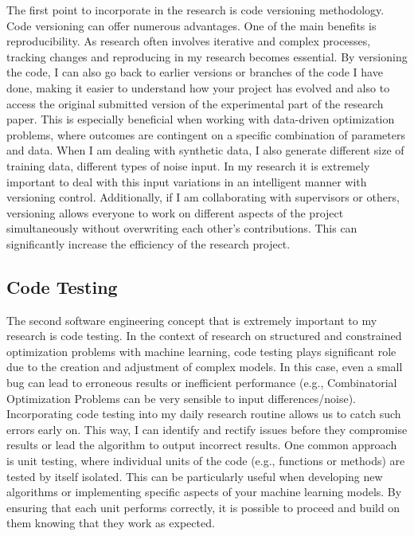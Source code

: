 \documentclass{article}
\begin{document}
The first point to incorporate in the research is code versioning methodology. Code versioning can offer numerous advantages. One of the main benefits is reproducibility. As research often involves iterative and complex processes, tracking changes and reproducing in my research becomes essential. By versioning the code, I can also go back to earlier versions or branches of the code I have done, making it easier to understand how your project has evolved and also to access the original submitted version of the experimental part of the research paper. This is especially beneficial when working with data-driven optimization problems, where outcomes are contingent on a specific combination of parameters and data. When I am dealing with synthetic data, I also generate different size of training data, different types of noise input. In my research it is extremely important to deal with this input variations in an intelligent manner with versioning control. Additionally, if I am collaborating with supervisors or others, versioning allows everyone to work on different aspects of the project simultaneously without overwriting each other's contributions. This can significantly increase the efficiency of the research project.


\subsection{Code Testing}

The second software engineering concept that is extremely important to my research is code testing. In the context of research on structured and constrained optimization problems with machine learning, code testing plays significant role due to the creation and adjustment of complex models. In this case, even a small bug can lead to erroneous results or inefficient performance (e.g., Combinatorial Optimization Problems can be very sensible to input differences/noise). Incorporating code testing into my daily research routine allows us to catch such errors early on. This way, I can identify and rectify issues before they compromise results or lead the algorithm to output incorrect results. One common approach is unit testing, where individual units of the code (e.g., functions or methods) are tested by itself isolated. This can be particularly useful when developing new algorithms or implementing specific aspects of your machine learning models. By ensuring that each unit performs correctly, it is possible to proceed and build on them knowing that they work as expected. 
\end{document}
